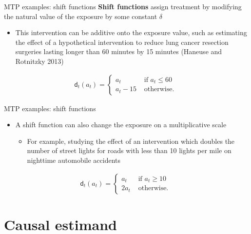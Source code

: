 \documentclass[
  10pt,
  ignorenonframetext,
]{beamer}
\providecommand{\tightlist}{%
  \setlength{\itemsep}{0pt}\setlength{\parskip}{0pt}}\usepackage{longtable,booktabs,array}
\begin{document}
\begin{frame}{MTP examples: shift functions}
\protect\hypertarget{mtp-examples-shift-functions}{}
\textbf{Shift functions} assign treatment by modifying the natural value
of the exposure by some constant \(\delta\)

\begin{itemize}
\tightlist
\item
  This intervention can be additive onto the exposure value, such as
  estimating the effect of a hypothetical intervention to reduce lung
  cancer resection surgeries lasting longer than 60 minutes by 15
  minutes (Haneuse and Rotnitzky 2013)
\end{itemize}

\begin{align*}
\mathsf{d}_t(a_t)=\begin{cases}
      a_t & \text{ if } a_t \leq 60 \\
      a_t - 15 & \text{ otherwise. }
    \end{cases}
\end{align*}
\end{frame}

\begin{frame}{MTP examples: shift functions}
\protect\hypertarget{mtp-examples-shift-functions-1}{}
\begin{itemize}
\tightlist
\item
  A shift function can also change the exposure on a multiplicative
  scale

  \begin{itemize}
  \tightlist
  \item
    For example, studying the effect of an intervention which doubles
    the number of street lights for roads with less than 10 lights per
    mile on nighttime automobile accidents
  \end{itemize}
\end{itemize}

\begin{align*}
\mathsf{d}_t(a_t)=\begin{cases}
      a_t & \text{ if } a_t \ge 10 \\
      2a_t & \text{ otherwise. }
    \end{cases}
    \end{align*}
\end{frame}

\hypertarget{causal-estimand}{%
\section{Causal estimand}\label{causal-estimand}}
\end{document}
